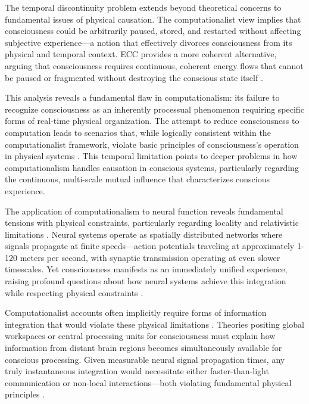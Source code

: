 The temporal discontinuity problem extends beyond theoretical concerns to fundamental issues of physical causation. The computationalist view implies that consciousness could be arbitrarily paused, stored, and restarted without affecting subjective experience—a notion that effectively divorces consciousness from its physical and temporal context. ECC provides a more coherent alternative, arguing that consciousness requires continuous, coherent energy flows that cannot be paused or fragmented without destroying the conscious state itself \cite{bickhard1995foundational}.

This analysis reveals a fundamental flaw in computationalism: its failure to recognize consciousness as an inherently processual phenomenon requiring specific forms of real-time physical organization. The attempt to reduce consciousness to computation leads to scenarios that, while logically consistent within the computationalist framework, violate basic principles of consciousness's operation in physical systems \cite{searle1980minds}. This temporal limitation points to deeper problems in how computationalism handles causation in conscious systems, particularly regarding the continuous, multi-scale mutual influence that characterizes conscious experience.

The application of computationalism to neural function reveals fundamental tensions with physical constraints, particularly regarding locality and relativistic limitations \cite{van1998dynamical}. Neural systems operate as spatially distributed networks where signals propagate at finite speeds—action potentials traveling at approximately 1-120 meters per second, with synaptic transmission operating at even slower timescales. Yet consciousness manifests as an immediately unified experience, raising profound questions about how neural systems achieve this integration while respecting physical constraints \cite{wheeler2005reconstructing}.

Computationalist accounts often implicitly require forms of information integration that would violate these physical limitations \cite{searle1980minds}. Theories positing global workspaces or central processing units for consciousness must explain how information from distant brain regions becomes simultaneously available for conscious processing. Given measurable neural signal propagation times, any truly instantaneous integration would necessitate either faster-than-light communication or non-local interactions—both violating fundamental physical principles \cite{piccinini2015physical}.

